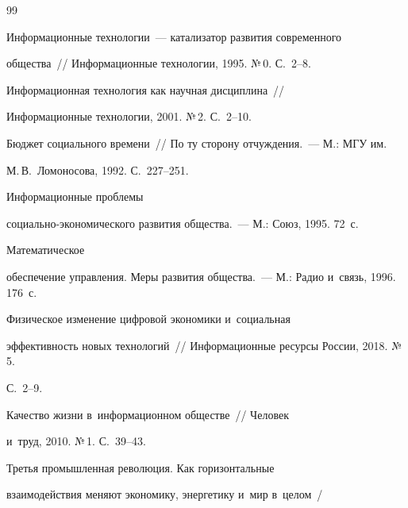 {\small\frenchspacing


{%




\begin{thebibliography}{99}




 Информационные технологии~--- катализатор раз\-ви\-тия современного 


общества~/\!\!/ Информационные технологии, 1995. №\,0. С.~2--8.




 Информационная технология как научная дис\-цип\-ли\-на~/\!\!/ 


Информационные технологии, 2001. №\,2. С.~2--10.




 Бюд\-жет социального времени~/\!\!/ По ту сторону от\-чуж\-де\-ния.~--- М.: МГУ им.\ 


М.\,В.~Ломоносова, 1992. С.~227--251.




 Информационные проб\-ле\-мы  


со\-ци\-аль\-но-эко\-но\-ми\-че\-ско\-го развития общества.~--- М.: Союз, 1995. 72~с.




 Математическое 


обеспечение управ\-ле\-ния. Меры развития общества.~--- М.: Радио и~связь, 1996. 176~с.




 Физическое изменение циф\-ро\-вой экономики и~социальная 


эф\-фек\-тив\-ность новых технологий~/\!\!/ Информационные ресурсы России, 2018. №\,5. 


С.~2--9.




 Качество жиз\-ни в~информационном обществе~/\!\!/ Человек 


и~труд, 2010. №\,1. С.~39--43.




 Третья промышленная революция. Как горизонтальные 


взаимодействия меняют экономику, энергетику и~мир в~целом~/



\end{thebibliography}}}
